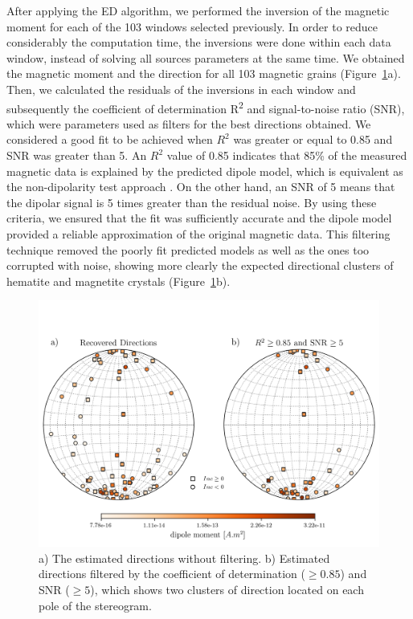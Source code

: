 After applying the ED algorithm, we performed the inversion of the magnetic moment for each of the 103 windows selected previously. In order to reduce considerably the computation time, the inversions were done within each data window, instead of solving all sources parameters at the same time. We obtained the magnetic moment and the direction for all 103 magnetic grains (Figure~\ref{real-data-stereograms}a). Then, we calculated the residuals of the inversions in each window and subsequently the coefficient of determination R\textsuperscript{2} and signal-to-noise ratio (SNR), which were parameters used as filters for the best directions obtained. We considered a good fit to be achieved when $R^2$ was greater or equal to 0.85 and SNR was greater than 5. An $R^2$ value of 0.85 indicates that 85\% of the measured magnetic data is explained by the predicted dipole model, which is equivalent as the non-dipolarity test approach \citep{Fu2020}. On the other hand, an SNR of 5 means that the dipolar signal is 5 times greater than the residual noise. By using these criteria, we ensured that the fit was sufficiently accurate and the dipole model provided a reliable approximation of the original magnetic data. This filtering technique removed the poorly fit predicted models as well as the ones too corrupted with noise, showing more clearly the expected directional clusters of hematite and magnetite crystals (Figure~\ref{real-data-stereograms}b).


\begin{figure}[tb]
\centering
\includegraphics[width=1\linewidth]{figures/real-data-stereograms.png}
\caption{
a) The estimated directions without filtering. b) Estimated directions filtered by the coefficient of determination ($\geq 0.85$) and SNR ($\geq 5$), which shows two clusters of direction located on each pole of the stereogram.
}
\label{real-data-stereograms}
\end{figure}

